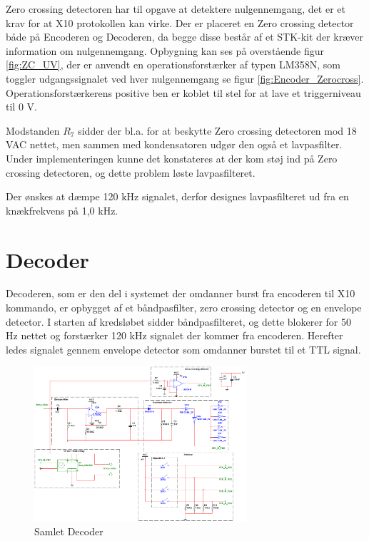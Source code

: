 Zero crossing detectoren har til opgave at detektere nulgennemgang, det er et krav for at X10 protokollen kan virke. Der er placeret en Zero crossing detector både på Encoderen og Decoderen, da begge disse består af et STK-kit der kræver information om nulgennemgang. Opbygning kan ses på overstående figur \ref{fig:ZC_UV}, der er anvendt en operationsforstærker af typen LM358N, som toggler udgangssignalet ved hver nulgennemgang se figur \ref{fig:Encoder_Zerocross}. Operationsforstærkerens positive ben er koblet til stel for at lave et triggerniveau til 0 V.

Modstanden $R_7$ sidder der bl.a. for at beskytte Zero crossing detectoren mod 18 VAC nettet, men sammen med kondensatoren udgør den også et lavpasfilter. Under implementeringen kunne det konstateres at der kom støj ind på Zero crossing detectoren, og dette problem løste lavpasfilteret. 

Der ønskes at dæmpe 120 kHz signalet, derfor designes lavpasfilteret ud fra en knækfrekvens på 1,0 kHz.

\section{Decoder}
Decoderen, som er den del i systemet der omdanner burst fra encoderen til X10 kommando, er opbygget af et båndpasfilter, zero crossing detector og en envelope detector. I starten af kredsløbet sidder båndpasfilteret, og dette blokerer for 50 Hz nettet og forstærker 120 kHz signalet der kommer fra encoderen. Herefter ledes signalet gennem envelope detector som omdanner burstet til et TTL signal.

\begin{figure}[htbp]
	\centering
	\includegraphics[width=0.70\textwidth]{billeder/HWdesign/Decoder}
	\caption{Samlet Decoder}
	\label{fig:Decoder}
\end{figure}


